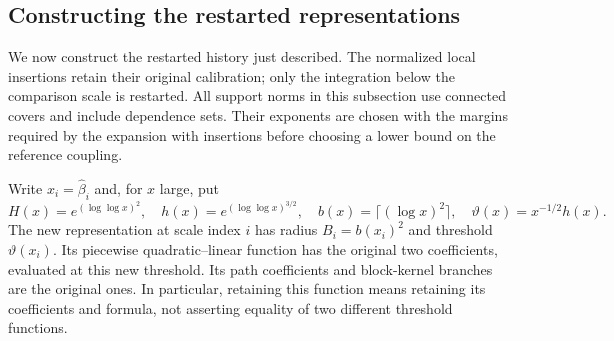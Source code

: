\subsection{Constructing the restarted representations}
\label{ch11:restart-construction}

We now construct the restarted history just described. The normalized local
insertions retain their original calibration; only the integration
below the comparison scale is restarted. All support norms in this
subsection use connected covers and include dependence sets.
Their exponents are chosen with the margins required by the expansion
with insertions before choosing a lower bound on the reference coupling.

Write $x_i=\widehat\beta_i$ and, for $x$ large, put
\[
 H(x)=e^{(\log\log x)^2},\quad h(x)=e^{(\log\log x)^{3/2}},\quad
 b(x)=\lceil(\log x)^2\rceil,\quad
 \vartheta(x)=x^{-1/2}h(x).
\]
The new representation at scale index $i$ has radius $B_i=b(x_i)^2$
and threshold $\vartheta(x_i)$. Its piecewise quadratic--linear function has the original two
coefficients, evaluated at this new threshold. Its path coefficients
and block-kernel branches are the original ones. In particular,
retaining this function means retaining its coefficients and formula,
not asserting equality of two different threshold functions.

